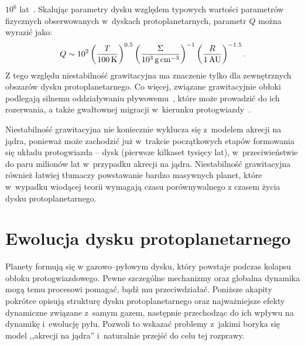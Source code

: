 $10^6$ lat~\cite{HB11, GHB12}. Skalując parametry dysku względem typowych
wartości parametrów fizycznych obserwowanych w~dyskach protoplanetarnych,
parametr $Q$ można wyrazić jako:
%
\begin{equation}
   Q \sim 10^2 
   \left(\frac{T}{100\hbox{$\thinspace\textrm{K}$}}\right)^{0.5}
   \left(\frac{\Sigma}{10^3\hbox{$\thinspace\textrm{g}$}\hbox{$\thinspace\textrm{cm}$}^{-3}}\right)^{-1}
   \left(\frac{R}{1\hbox{$\thinspace\textrm{AU}$}}\right)^{-1.5}.
   \label{eq:Qemp}
\end{equation}
%
Z tego względu niestabilność grawitacyjna ma znaczenie tylko dla zewnętrznych
obszarów dysku protoplanetarnego. Co więcej, związane grawitacyjnie obłoki
podlegają silnemu oddziaływaniu pływowemu~\cite{VH12}, które może prowadzić do
ich rozerwania, a także gwałtownej migracji w~kierunku protogwiazdy~\cite{BMP11}.

\par Niestabilność grawitacyjna nie koniecznie wyklucza się z~modelem akrecji na
jądra, ponieważ może zachodzić już w~trakcie początkowych etapów formowania się
układu protogwiazda -- dysk (pierwsze kilkaset tysięcy lat), w~przeciwieństwie
do paru milionów lat w~przypadku akrecji na jądra. Niestabilność grawitacyjna
również łatwiej tłumaczy powstawanie bardzo masywnych planet, które w~wypadku
wiodącej teorii wymagają czasu porównywalnego z czasem życia dysku
protoplanetarnego\cite{HBP13}.

\section{Ewolucja dysku protoplanetarnego}
Planety formują się w gazowo--pyłowym dysku, który powstaje podczas kolapsu
obłoku protogwiazdowego. Pewne szczególne mechanizmy oraz globalna dynamika mogą
temu procesowi pomagać, bądź mu przeciwdziałać. Poniższe akapity pokrótce
opisują strukturę dysku protoplanetarnego oraz najważniejsze efekty dynamiczne
związane z~samym gazem, następnie przechodząc do ich wpływu na dynamikę
i~ewolucję pyłu. Pozwoli to wskazać problemy z~jakimi boryka się model ,,akrecji
na jądra'' i~naturalnie przejść do celu tej rozprawy.

